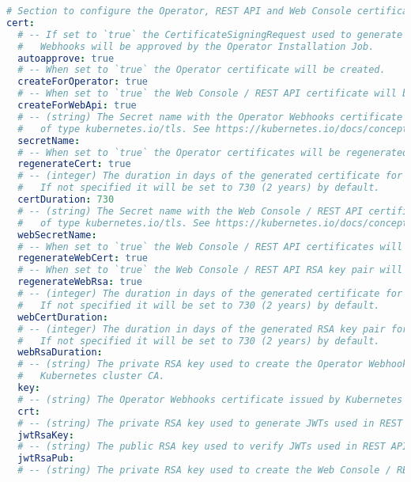 \begin{lstlisting}[language=yaml, caption=StackGres-Citus - Helm Chart Manifest,captionpos=b,label={lst:stackgres_citus-values.yaml},breaklines=true]
# Section to configure the Operator, REST API and Web Console certificates and JWT RSA key-pair.
cert:
  # -- If set to `true` the CertificateSigningRequest used to generate the certificate used by
  #   Webhooks will be approved by the Operator Installation Job.
  autoapprove: true
  # -- When set to `true` the Operator certificate will be created.
  createForOperator: true
  # -- When set to `true` the Web Console / REST API certificate will be created.
  createForWebApi: true
  # -- (string) The Secret name with the Operator Webhooks certificate issued by the Kubernetes cluster CA
  #   of type kubernetes.io/tls. See https://kubernetes.io/docs/concepts/configuration/secret/#tls-secrets
  secretName:
  # -- When set to `true` the Operator certificates will be regenerated if `createForOperator` is set to `true`, and the certificate is expired or invalid.
  regenerateCert: true
  # -- (integer) The duration in days of the generated certificate for the Operator after which it will expire and be regenerated.
  #   If not specified it will be set to 730 (2 years) by default.
  certDuration: 730
  # -- (string) The Secret name with the Web Console / REST API certificate
  #   of type kubernetes.io/tls. See https://kubernetes.io/docs/concepts/configuration/secret/#tls-secrets
  webSecretName:
  # -- When set to `true` the Web Console / REST API certificates will be regenerated if `createForWebApi` is set to `true`, and the certificate is expired or invalid.
  regenerateWebCert: true
  # -- When set to `true` the Web Console / REST API RSA key pair will be regenerated if `createForWebApi` is set to `true`, and the certificate is expired or invalid.
  regenerateWebRsa: true
  # -- (integer) The duration in days of the generated certificate for the Web Console / REST API after which it will expire and be regenerated.
  #   If not specified it will be set to 730 (2 years) by default.
  webCertDuration:
  # -- (integer) The duration in days of the generated RSA key pair for the Web Console / REST API after which it will expire and be regenerated.
  #   If not specified it will be set to 730 (2 years) by default.
  webRsaDuration:
  # -- (string) The private RSA key used to create the Operator Webhooks certificate issued by the
  #   Kubernetes cluster CA.
  key:
  # -- (string) The Operator Webhooks certificate issued by Kubernetes cluster CA.
  crt:
  # -- (string) The private RSA key used to generate JWTs used in REST API authentication.
  jwtRsaKey:
  # -- (string) The public RSA key used to verify JWTs used in REST API authentication.
  jwtRsaPub:
  # -- (string) The private RSA key used to create the Web Console / REST API certificate

\end{lstlisting}
